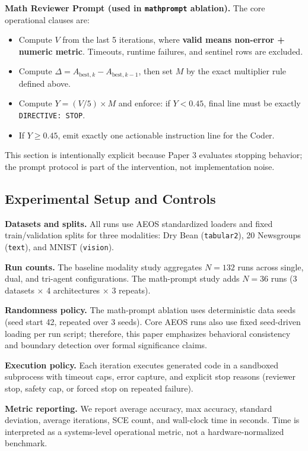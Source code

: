 \documentclass[11pt,a4paper]{article}
\begin{document}
\textbf{Math Reviewer Prompt (used in \texttt{mathprompt} ablation).} The core operational clauses are:
\begin{itemize}
    \item Compute $V$ from the last 5 iterations, where \textbf{valid means non-error + numeric metric}. Timeouts, runtime failures, and sentinel rows are excluded.
    \item Compute $\Delta = A_{\text{best},k} - A_{\text{best},k-1}$, then set $M$ by the exact multiplier rule defined above.
    \item Compute $Y = (V/5)\times M$ and enforce: if $Y<0.45$, final line must be exactly \texttt{DIRECTIVE: STOP}.
    \item If $Y\ge0.45$, emit exactly one actionable instruction line for the Coder.
\end{itemize}

This section is intentionally explicit because Paper 3 evaluates stopping behavior; the prompt protocol is part of the intervention, not implementation noise.

\subsection{Experimental Setup and Controls}

\textbf{Datasets and splits.} All runs use AEOS standardized loaders and fixed train/validation splits for three modalities: Dry Bean (\texttt{tabular2}), 20 Newsgroups (\texttt{text}), and MNIST (\texttt{vision}).

\textbf{Run counts.} The baseline modality study aggregates $N=132$ runs across single, dual, and tri-agent configurations. The math-prompt study adds $N=36$ runs (3 datasets $\times$ 4 architectures $\times$ 3 repeats).

\textbf{Randomness policy.} The math-prompt ablation uses deterministic data seeds (seed start 42, repeated over 3 seeds). Core AEOS runs also use fixed seed-driven loading per run script; therefore, this paper emphasizes behavioral consistency and boundary detection over formal significance claims.

\textbf{Execution policy.} Each iteration executes generated code in a sandboxed subprocess with timeout caps, error capture, and explicit stop reasons (reviewer stop, safety cap, or forced stop on repeated failure).

\textbf{Metric reporting.} We report average accuracy, max accuracy, standard deviation, average iterations, SCE count, and wall-clock time in seconds. Time is interpreted as a systems-level operational metric, not a hardware-normalized benchmark.
\end{document}
